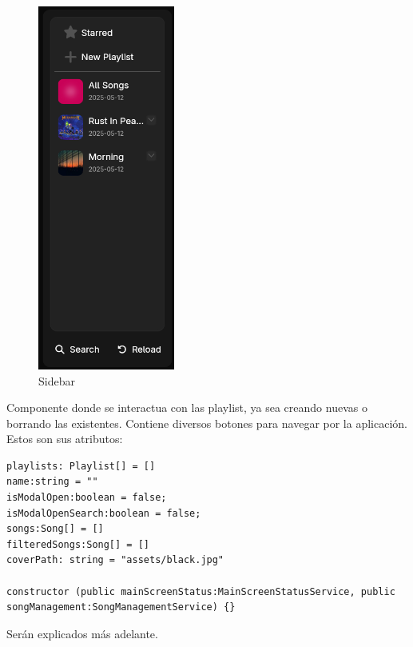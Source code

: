 \documentclass[11pt, a4paper]{article}
\begin{document}
            \begin{figure}[H]
                \centering
                \includegraphics[width=0.4\textwidth]{media/screenshots/sidebar.png}
                \caption{Sidebar}
                \label{fig:sidebar}
            \end{figure}

            Componente donde se interactua con las playlist, ya sea creando nuevas o borrando las existentes. Contiene diversos botones para navegar por la aplicación. \\

            Estos son sus atributos:

            \begin{lstlisting}[caption={Atributos Y Constructora Sidebar}]
playlists: Playlist[] = []
name:string = ""
isModalOpen:boolean = false;
isModalOpenSearch:boolean = false;
songs:Song[] = []
filteredSongs:Song[] = []
coverPath: string = "assets/black.jpg"

constructor (public mainScreenStatus:MainScreenStatusService, public songManagement:SongManagementService) {}
            \end{lstlisting}

            Serán explicados más adelante.
\end{document}
